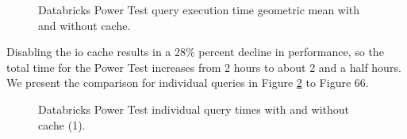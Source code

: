 \begin{figure}
   \begin{center}
   \end{center}
   \caption{Databricks Power Test query execution time geometric mean with and without cache.}
   \label{fig:additionalResultsDatabricksNoCachePowerTestArithmeticMean}
\end{figure}

Disabling the io cache results in a 28\% percent decline in performance, so the total time for the Power Test increases from 2 hours to about 2 and a half hours. We present the comparison for individual queries in Figure \ref{fig:additionalResultsDatabricksNoCachePowerTestIndividualQueries1} to Figure 66.

\begin{figure}
   \begin{center}
   \end{center}
   \caption{Databricks Power Test individual query times with and without cache (1).}
   \label{fig:additionalResultsDatabricksNoCachePowerTestIndividualQueries1}
\end{figure}

